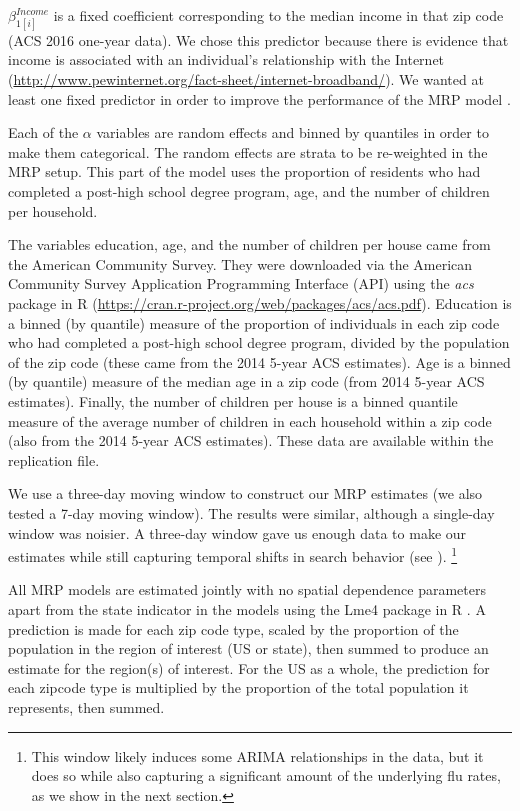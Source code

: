\documentclass[12pt]{article}
\begin{document}
$\beta_{1[i]}^{Income}$ is a fixed coefficient corresponding to the median income in that zip code (ACS 2016 one-year data). We chose this predictor because there is evidence that income is associated with an individual's relationship with the Internet (\url{http://www.pewinternet.org/fact-sheet/internet-broadband/}). We wanted at least one fixed predictor in order to improve the performance of the MRP model \citep{buttice_and_highton_2013}.

Each of the $\alpha$ variables are random effects and binned by quantiles in order to make them categorical. The random effects are strata to be re-weighted in the MRP setup. This part of the model uses the proportion of residents who had completed a post-high school degree program, age, and the number of children per household.

The variables education, age, and the number of children per house came from the American Community Survey. They were downloaded via the American Community Survey Application Programming Interface (API) using the \emph{acs} package in R (\url{https://cran.r-project.org/web/packages/acs/acs.pdf}). Education is a binned (by quantile) measure of the proportion of individuals in each zip code who had completed a post-high school degree program, divided by the population of the zip code (these came from the 2014 5-year ACS estimates). Age is a binned (by quantile) measure of the median age in a zip code (from 2014 5-year ACS estimates). Finally, the number of children per house is a binned quantile measure of the average number of children in each household within a zip code (also from the 2014 5-year ACS estimates). These data are available within the replication file.

We use a three-day moving window to construct our MRP estimates (we also tested a 7-day moving window). The results were similar, although a single-day window was noisier. A three-day window gave us enough data to make our estimates while still capturing temporal shifts in search behavior (see \citet{yang_etal_2015inference}). \footnote{This window likely induces some ARIMA relationships in the data, but it does so while also capturing a significant amount of the underlying flu rates, as we show in the next section.}

All MRP models are estimated jointly with no spatial dependence parameters apart from the state indicator in the models using the Lme4 package in R \citep{bates_etal_2015}. A prediction is made for each zip code type, scaled by the proportion of the population in the region of interest (US or state), then summed to produce an estimate for the region(s) of interest. For the US as a whole, the prediction for each zipcode type is multiplied by the proportion of the total population it represents, then summed.
\end{document}

